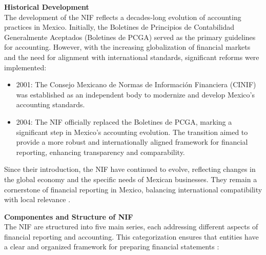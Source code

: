\documentclass[10pt]{article}
\begin{document}
\textbf{Historical Development}\\
The development of the NIF reflects a decades-long evolution of accounting practices in Mexico. Initially, the Boletines de Principios de Contabilidad Generalmente Aceptados (Boletines de PCGA) served as the primary guidelines for accounting. However, with the increasing globalization of financial markets and the need for alignment with international standards, significant reforms were implemented:

\begin{itemize}
    \item 2001: The Consejo Mexicano de Normas de Información Financiera (CINIF) was established as an independent body to modernize and develop Mexico's accounting standards.

    \item 2004: The NIF officially replaced the Boletines de PCGA, marking a significant step in Mexico's accounting evolution. The transition aimed to provide a more robust and internationally aligned framework for financial reporting, enhancing transparency and comparability.

\end{itemize}

Since their introduction, the NIF have continued to evolve, reflecting changes in the global economy and the specific needs of Mexican businesses. They remain a cornerstone of financial reporting in Mexico, balancing international compatibility with local relevance \cite{JPA}.

\textbf{Componentes and Structure of NIF}\\
The NIF are structured into five main series, each addressing different aspects of financial reporting and accounting. This categorization ensures that entities have a clear and organized framework for preparing financial statements \cite{Cinif}:
\end{document}
